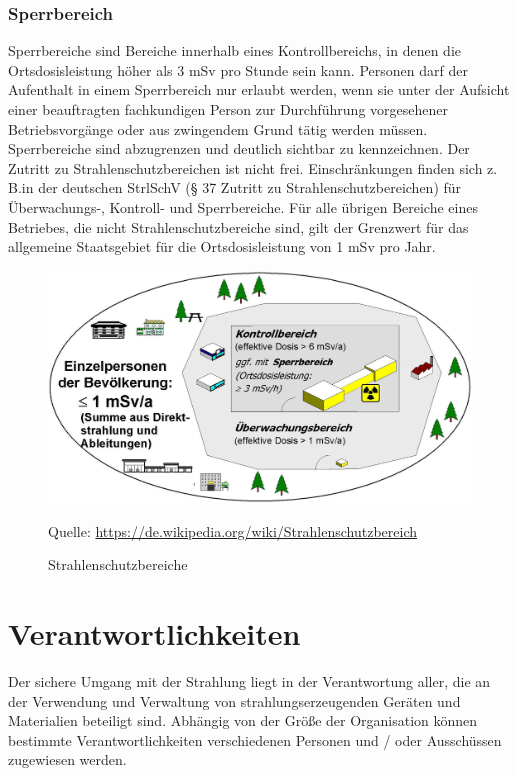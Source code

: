 {\subsubsection{Sperrbereich}
Sperrbereiche sind Bereiche innerhalb eines Kontrollbereichs, in denen die Ortsdosisleistung höher als 3 mSv pro Stunde sein kann. Personen darf der Aufenthalt in einem Sperrbereich nur erlaubt werden, wenn sie unter der Aufsicht einer beauftragten fachkundigen Person zur Durchführung vorgesehener Betriebsvorgänge oder aus zwingendem Grund tätig werden müssen. Sperrbereiche sind abzugrenzen und deutlich sichtbar zu kennzeichnen.
Der Zutritt zu Strahlenschutzbereichen ist nicht frei. Einschränkungen finden sich z. B.in der deutschen StrlSchV (§ 37 Zutritt zu Strahlenschutzbereichen) für Überwachungs-, Kontroll- und Sperrbereiche.
Für alle übrigen Bereiche eines Betriebes, die nicht Strahlenschutzbereiche sind, gilt der Grenzwert für das allgemeine Staatsgebiet für die Ortsdosisleistung von 1 mSv pro Jahr.
\begin{figure}[htb]
  \includegraphics[scale=0.3]{img/Strahlenschutzbereiche.jpg}\\
  \caption{Strahlenschutzbereiche}
  \label{fig:Strahlenschutzbereiche}
  Quelle: \url{https://de.wikipedia.org/wiki/Strahlenschutzbereich}\\
\end{figure}

\section{Verantwortlichkeiten}
Der sichere Umgang mit der Strahlung liegt in der Verantwortung aller, die an der Verwendung und Verwaltung von strahlungserzeugenden Geräten und Materialien beteiligt sind. Abhängig von der Größe der Organisation können bestimmte Verantwortlichkeiten verschiedenen Personen und / oder Ausschüssen zugewiesen werden.
}

